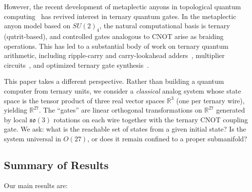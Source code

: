 \documentclass[12pt,a4paper]{article}
\begin{document}
However, the recent development of metaplectic anyons in topological
quantum computing~\cite{bocharov2016improved} has revived interest in
ternary quantum gates. In the metaplectic anyon model based on $SU(2)_4$,
the natural computational basis is ternary (qutrit-based), and controlled
gates analogous to CNOT arise as braiding operations. This has led to a
substantial body of work on ternary quantum arithmetic, including ripple-carry
and carry-lookahead adders~\cite{bocharov2016improved}, multiplier
circuits~\cite{ilyas2022ternary}, and optimized ternary gate
synthesis~\cite{koleTernary}.

This paper takes a different perspective. Rather than building a quantum
computer from ternary units, we consider a \emph{classical} analog system
whose state space is the tensor product of three real vector spaces
$\mathbb{R}^3$ (one per ternary wire), yielding $\mathbb{R}^{27}$. The
``gates'' are linear orthogonal transformations on $\mathbb{R}^{27}$
generated by local $\mathfrak{so}(3)$ rotations on each wire together
with the ternary CNOT coupling gate. We ask: what is the reachable set
of states from a given initial state? Is the system universal in
$O(27)$, or does it remain confined to a proper submanifold?

\subsection{Summary of Results}

Our main results are:
\end{document}

